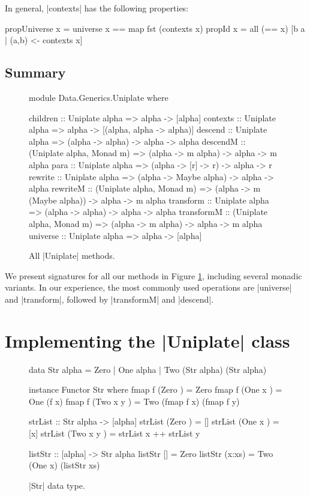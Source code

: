 In general, |contexts| has the following properties:

\begin{code}
propUniverse  x = universe x == map fst (contexts x)
propId        x = all (== x) [b a | (a,b) <- contexts x]
\end{code}



\subsection{Summary}

\begin{figure}
\begin{code}
module Data.Generics.Uniplate where

children    :: Uniplate alpha => alpha -> [alpha]
contexts    :: Uniplate alpha => alpha -> [(alpha, alpha -> alpha)]
descend     :: Uniplate alpha => (alpha -> alpha) -> alpha -> alpha
descendM    :: (Uniplate alpha, Monad m) => (alpha -> m alpha) -> alpha -> m alpha
para        :: Uniplate alpha => (alpha -> [r] -> r) -> alpha -> r
rewrite     :: Uniplate alpha => (alpha -> Maybe alpha) -> alpha -> alpha
rewriteM    :: (Uniplate alpha, Monad m)  => (alpha -> m (Maybe alpha)) -> alpha -> m alpha
transform   :: Uniplate alpha => (alpha -> alpha) -> alpha -> alpha
transformM  :: (Uniplate alpha, Monad m) => (alpha -> m alpha) -> alpha -> m alpha
universe    :: Uniplate alpha => alpha -> [alpha]
\end{code}
\caption{All |Uniplate| methods.}
\label{figU:play}
\end{figure}

We present signatures for all our methods in Figure \ref{figU:play}, including several monadic variants. In our experience, the most commonly used operations are |universe| and |transform|, followed by |transformM| and |descend|.


\section{Implementing the |Uniplate| class}
\label{secU:implement_play}

\begin{figure}
\begin{code}
data Str alpha = Zero | One alpha | Two (Str alpha) (Str alpha)

instance Functor Str where
    fmap f (Zero      ) = Zero
    fmap f (One  x    ) = One (f x)
    fmap f (Two  x y  ) = Two (fmap f x) (fmap f y)

strList :: Str alpha -> [alpha]
strList (Zero      ) = []
strList (One  x    ) = [x]
strList (Two  x y  ) = strList x ++ strList y

listStr :: [alpha] -> Str alpha
listStr []      = Zero
listStr (x:xs)  = Two (One x) (listStr xs)
\end{code}
\caption{|Str| data type.}
\label{figU:str}
\end{figure}

